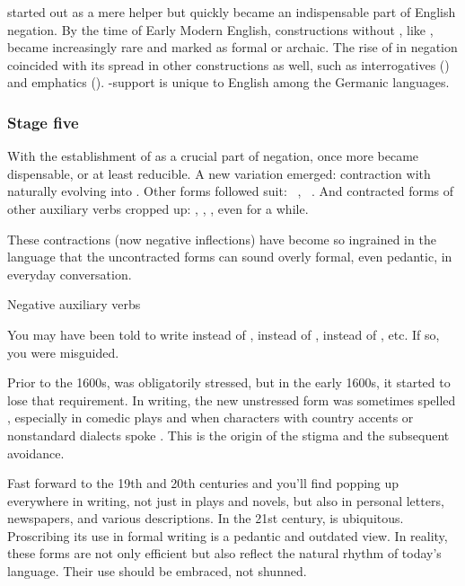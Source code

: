  started out as a mere helper but quickly became an indispensable part of English negation. By the time of Early Modern English, constructions without , like , became increasingly rare and marked as formal or archaic. The rise of  in negation coincided with its spread in other constructions as well, such as interrogatives () and emphatics (). -support is unique to English among the Germanic languages.

\subsubsection*{Stage five}

With the establishment of  as a crucial part of negation,  once more became dispensable, or at least reducible. A new variation emerged: contraction with  naturally evolving into . Other forms followed suit:  \rightarrow ~,  \rightarrow ~. And contracted forms of other auxiliary verbs cropped up: , , , even  for a while.

These contractions (now negative inflections) have become so ingrained in the language that the uncontracted forms can sound overly formal, even pedantic, in everyday conversation.

\begin{tblsframed}{Negative auxiliary verbs}

You may have been told to write  instead of ,  instead of ,  instead of , etc. If so, you were misguided.

\phantom{fri}Prior to the 1600s,  was obligatorily stressed, but in the early 1600s, it started to lose that requirement. In writing, the new unstressed form was sometimes spelled , especially in comedic plays and when characters with country accents or nonstandard dialects spoke \citep{Brainerd1989}. This is the origin of the stigma and the subsequent avoidance.

\phantom{fri}Fast forward to the 19th and 20th centuries and you'll find  popping up everywhere in writing, not just in plays and novels, but also in personal letters, newspapers, and various descriptions. In the 21st century,  is ubiquitous. Proscribing its use in formal writing is a pedantic and outdated view. In reality, these forms are not only efficient but also reflect the natural rhythm of today's language. Their use should be embraced, not shunned.

\end{tblsframed}

